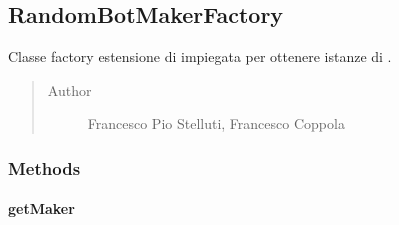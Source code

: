 \documentclass[letterpaper,10pt,italian,openany,oneside]{sphinxmanual}
\begin{document}
\subsection{RandomBotMakerFactory}
\label{\detokenize{source/it/unicam/cs/pa/mastermind/factories/RandomBotMakerFactory:randombotmakerfactory}}\label{\detokenize{source/it/unicam/cs/pa/mastermind/factories/RandomBotMakerFactory::doc}}

\begin{fulllineitems}
\label{\detokenize{source/it/unicam/cs/pa/mastermind/factories/RandomBotMakerFactory:it.unicam.cs.pa.mastermind.factories.RandomBotMakerFactory}}
Classe factory estensione di  impiegata per ottenere istanze di .
\begin{quote}\begin{description}
\item[{Author}] \leavevmode
Francesco Pio Stelluti, Francesco Coppola

\end{description}\end{quote}

\end{fulllineitems}



\subsubsection{Methods}
\label{\detokenize{source/it/unicam/cs/pa/mastermind/factories/RandomBotMakerFactory:methods}}

\paragraph{getMaker}
\label{\detokenize{source/it/unicam/cs/pa/mastermind/factories/RandomBotMakerFactory:getmaker}}

\begin{fulllineitems}
\label{\detokenize{source/it/unicam/cs/pa/mastermind/factories/RandomBotMakerFactory:it.unicam.cs.pa.mastermind.factories.RandomBotMakerFactory.getMaker()}}
\end{fulllineitems}
\end{document}
